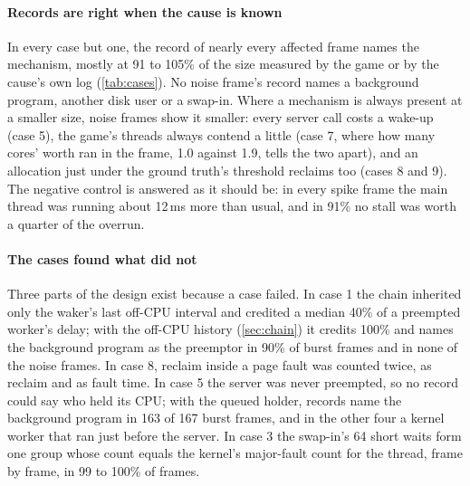 \begin{table}[t]
\centering
\footnotesize

\caption{Case studies (VM). \emph{Explained}: over-budget frames affected by
the cause whose record names the mechanism. \emph{Amount}: the record's time
for the mechanism over the game's or the cause's own measure of it, median.
\emph{Ranked first}: the mechanism's stall group is the record's first by
total, or by \emph{stall time}, a ranking replayed offline that leaves out
waits on threads that were running and timer sleeps; on-CPU kernel time is
never a group. Ranges cover a case's variants and, for case 5, a run before
and after the queued holder. Case 4's sleep is measured, not explained.}
\label{tab:cases}
\end{table}

\paragraph{Records are right when the cause is known} In every case but one,
the record of nearly every affected frame names the mechanism, mostly at 91
to 105\% of the size measured by the game or by the cause's own log
(\autoref{tab:cases}). No noise frame's record names a background program,
another disk user or a swap-in. Where a mechanism is always present at a
smaller size, noise frames show it smaller: every server call costs a
wake-up (case 5), the game's threads always contend a little (case 7, where
how many cores' worth ran in the frame, 1.0 against 1.9, tells the two
apart), and an allocation just under the ground truth's threshold reclaims
too (cases 8 and 9). The negative control is answered as it should be: in
every spike frame the main thread was running about 12\,ms more than usual,
and in 91\% no stall was worth a quarter of the overrun.

\paragraph{The cases found what \bench did not} Three parts of the design exist
because a case failed. In case 1 the chain inherited only the waker's last
off-CPU interval and credited a median 40\% of a preempted worker's delay;
with the off-CPU history (\autoref{sec:chain}) it credits 100\% and names the
background program as the preemptor in 90\% of burst frames and in none of
the noise frames. In case 8, reclaim inside a page fault was counted twice,
as reclaim and as fault time. In case 5 the server was never preempted, so
no record could say who held its CPU; with the queued holder, records name
the background program in 163 of 167 burst frames, and in the other four a
kernel worker that ran just before the server. In case 3 the swap-in's 64
short waits form one group whose count equals the kernel's major-fault
count for the thread, frame by frame, in 99 to 100\% of frames.

